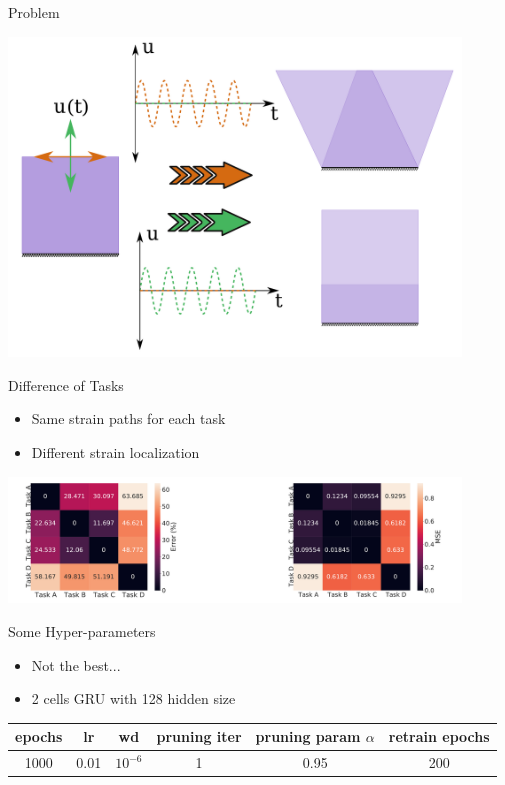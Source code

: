 \documentclass[aspectratio=169]{beamer}
\begin{document}
\begin{frame}{Problem}
\begin{minipage}{0.5\textwidth}
  \end{minipage}%
  \begin{minipage}{0.5\textwidth}
    \centering
    \includegraphics[width=0.9\textwidth]{figures/problem.pdf}
  \end{minipage}
\end{frame}

\begin{frame}{Difference of Tasks}
    \begin{itemize}
      \item Same strain paths for each task
      \item Different strain localization 
    \end{itemize}
    \centering
    \includegraphics[width=0.9\textwidth]{figures/diff.pdf}
\end{frame}

\begin{frame}{Some Hyper-parameters}
    \begin{itemize}
      \item Not the best...
      \item 2 cells GRU with 128 hidden size
    \end{itemize}
  \centering
  \begin{tabular}{|c|c|c|c|c|c|}
    \hline
   epochs & lr & wd & pruning iter & pruning param $\alpha$ & retrain epochs  \\ %
  \hline
    1000 & 0.01 & $10^{-6}$ & 1 & 0.95 & 200 \\
  \hline
  \end{tabular}
\end{frame}
\end{document}
